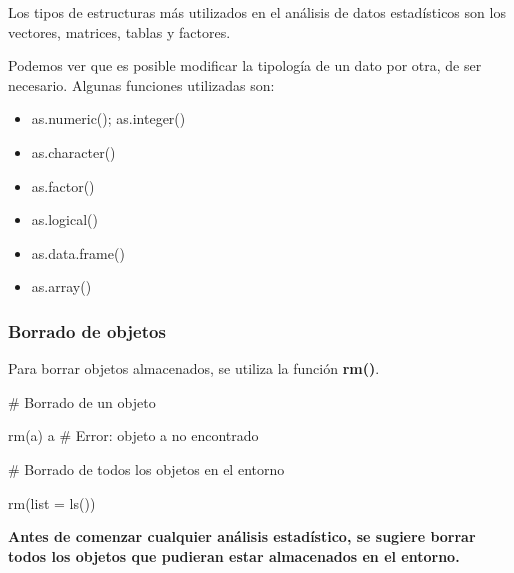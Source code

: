 \documentclass[
  spanish,
  letterpaper,
  DIV=11,
  numbers=noendperiod]{scrreprt}
\newenvironment{Shaded}{\begin{snugshade}}{\end{snugshade}}
\newcommand{\AttributeTok}[1]{\textcolor[rgb]{0.40,0.45,0.13}{#1}}
\newcommand{\CommentTok}[1]{\textcolor[rgb]{0.37,0.37,0.37}{#1}}
\newcommand{\FunctionTok}[1]{\textcolor[rgb]{0.28,0.35,0.67}{#1}}
\newcommand{\NormalTok}[1]{\textcolor[rgb]{0.00,0.23,0.31}{#1}}
\begin{document}
Los tipos de estructuras más utilizados en el análisis de datos
estadísticos son los vectores, matrices, tablas y factores.

Podemos ver que es posible modificar la tipología de un dato por otra,
de ser necesario. Algunas funciones utilizadas son:

\begin{itemize}
\item
  as.numeric(); as.integer()
\item
  as.character()
\item
  as.factor()
\item
  as.logical()
\item
  as.data.frame()
\item
  as.array()
\end{itemize}

\subsubsection{Borrado de objetos}\label{borrado-de-objetos}

Para borrar objetos almacenados, se utiliza la función \textbf{rm()}.

\begin{Shaded}
\begin{Highlighting}[]

\CommentTok{\# Borrado de un objeto}

\FunctionTok{rm}\NormalTok{(a)}
\NormalTok{a}
\CommentTok{\# Error: objeto \textquotesingle{}a\textquotesingle{} no encontrado}

\CommentTok{\# Borrado de todos los objetos en el entorno}

\FunctionTok{rm}\NormalTok{(}\AttributeTok{list =} \FunctionTok{ls}\NormalTok{())}
\end{Highlighting}
\end{Shaded}

\begin{tcolorbox}[enhanced jigsaw, arc=.35mm, bottomrule=.15mm, bottomtitle=1mm, breakable, colback=white, colbacktitle=quarto-callout-tip-color!10!white, colframe=quarto-callout-tip-color-frame, coltitle=black, left=2mm, leftrule=.75mm, opacityback=0, opacitybacktitle=0.6, rightrule=.15mm, title=\textcolor{quarto-callout-tip-color}{\faLightbulb}\hspace{0.5em}{Tip}, titlerule=0mm, toprule=.15mm, toptitle=1mm]

\textbf{Antes de comenzar cualquier análisis estadístico, se sugiere
borrar todos los objetos que pudieran estar almacenados en el entorno.}

\end{tcolorbox}
\end{document}
